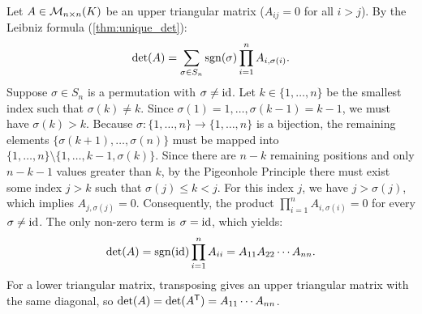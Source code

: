 \begin{exercisesolution}
\label{sol:triangular_matrix_determinant}
Let $A \in \mathcal{M}_{n \times n}(K)$ be an upper triangular matrix ($A_{ij} = 0$ for all $i > j$).
By the Leibniz formula (\cref{thm:unique_det}):
\[
\det(A) = \sum_{\sigma \in S_n} \operatorname{sgn}(\sigma) \prod_{i=1}^n A_{i, \sigma(i)}.
\]
Suppose $\sigma \in S_n$ is a permutation with $\sigma \ne \operatorname{id}$.
Let $k \in \{1, \dots, n\}$ be the smallest index such that $\sigma(k) \ne k$.
Since $\sigma(1) = 1, \dots, \sigma(k-1) = k-1$, we must have $\sigma(k) > k$.
Because $\sigma \colon \{1, \dots, n\} \to \{1, \dots, n\}$ is a bijection, the remaining elements $\{\sigma(k+1), \dots, \sigma(n)\}$ must be mapped into $\{1, \dots, n\} \setminus \{1, \dots, k-1, \sigma(k)\}$.
Since there are $n - k$ remaining positions and only $n - k - 1$ values greater than $k$, by the Pigeonhole Principle there must exist some index $j > k$ such that $\sigma(j) \le k < j$.
For this index $j$, we have $j > \sigma(j)$, which implies $A_{j, \sigma(j)} = 0$.
Consequently, the product $\prod_{i=1}^n A_{i, \sigma(i)} = 0$ for every $\sigma \ne \operatorname{id}$.
The only non-zero term is $\sigma = \operatorname{id}$, which yields:
\[
\det(A) = \operatorname{sgn}(\operatorname{id}) \prod_{i=1}^n A_{ii} = A_{11} A_{22} \cdots A_{nn}.
\]
For a lower triangular matrix, transposing gives an upper triangular matrix with the same diagonal, so $\det(A) = \det(A^{\mathsf{T}}) = A_{11} \cdots A_{nn}$.
\end{exercisesolution}

